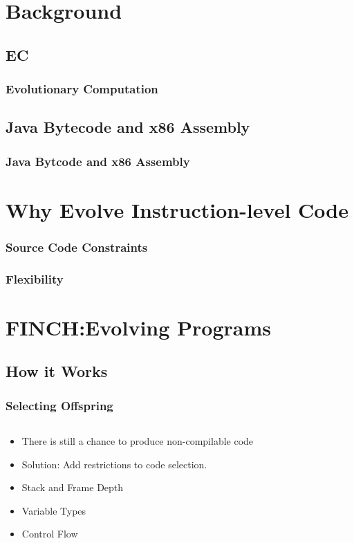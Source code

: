 \documentclass{beamer}
\begin{document}
\section[Background]{Background}

\subsection[EC]{EC}

\begin{frame}
  \frametitle{Evolutionary Computation}

\end{frame}

\subsection[Bytecode and Assembly]{Java Bytecode and x86 Assembly}
\begin{frame}
\frametitle{Java Bytcode and x86 Assembly}
\end{frame}

\section[Why Instruction-level code]{Why Evolve Instruction-level Code}

\begin{frame}
	\frametitle{Source Code Constraints}
\end{frame}

\begin{frame}
	\frametitle{Flexibility}
\end{frame}

\section[FINCH]{FINCH:Evolving Programs}

\subsection[How it works]{How it Works}
\begin{frame}
  \frametitle{Selecting Offspring}
  
  \begin{columns}
  \begin{column}{0.6\textwidth}
  \begin{itemize}
  	\item There is still a chance to produce non-compilable code
	\item Solution: Add restrictions to code selection.
	\item Stack and Frame Depth
	\item Variable Types
	\item Control Flow
  \end{itemize}
  \end{column}
  \begin{column}{0.4\textwidth}
	  
  \end{column}
	  
  
  \end{columns}
\end{frame}
\end{document}
